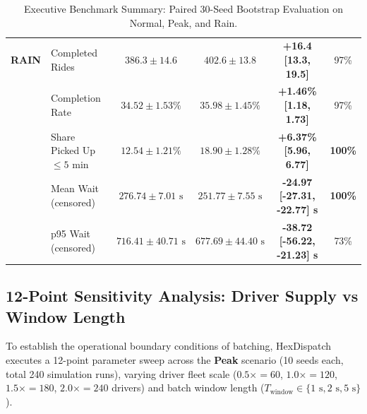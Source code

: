 \documentclass[11pt,a4paper]{article}
\begin{document}
\begin{table}[htbp]
\begin{tabularx}{\textwidth}{l l c c c c}
\midrule
\textbf{RAIN} & Completed Rides & $386.3 \pm 14.6$ & $402.6 \pm 13.8$ & \textbf{+16.4 [13.3, 19.5]} & 97\% \\
& Completion Rate & $34.52 \pm 1.53\%$ & $35.98 \pm 1.45\%$ & \textbf{+1.46\% [1.18, 1.73]} & 97\% \\
& Share Picked Up $\le 5$ min & $12.54 \pm 1.21\%$ & $18.90 \pm 1.28\%$ & \textbf{+6.37\% [5.96, 6.77]} & \textbf{100\%} \\
& Mean Wait (censored) & $276.74 \pm 7.01\text{ s}$ & $251.77 \pm 7.55\text{ s}$ & \textbf{-24.97 [-27.31, -22.77] s} & \textbf{100\%} \\
& p95 Wait (censored) & $716.41 \pm 40.71\text{ s}$ & $677.69 \pm 44.40\text{ s}$ & \textbf{-38.72 [-56.22, -21.23] s} & 73\% \\
\bottomrule
\end{tabularx}
\caption{Executive Benchmark Summary: Paired 30-Seed Bootstrap Evaluation on Normal, Peak, and Rain.}
\label{tab:benchmark_30seeds}
\end{table}

\subsection{12-Point Sensitivity Analysis: Driver Supply vs Window Length}
To establish the operational boundary conditions of batching, HexDispatch executes a 12-point parameter sweep across the \textbf{Peak} scenario (10 seeds each, total 240 simulation runs), varying driver fleet scale ($0.5\times = 60$, $1.0\times = 120$, $1.5\times = 180$, $2.0\times = 240$ drivers) and batch window length ($T_{\text{window}} \in \{1\text{ s}, 2\text{ s}, 5\text{ s}\}$).
\end{document}
